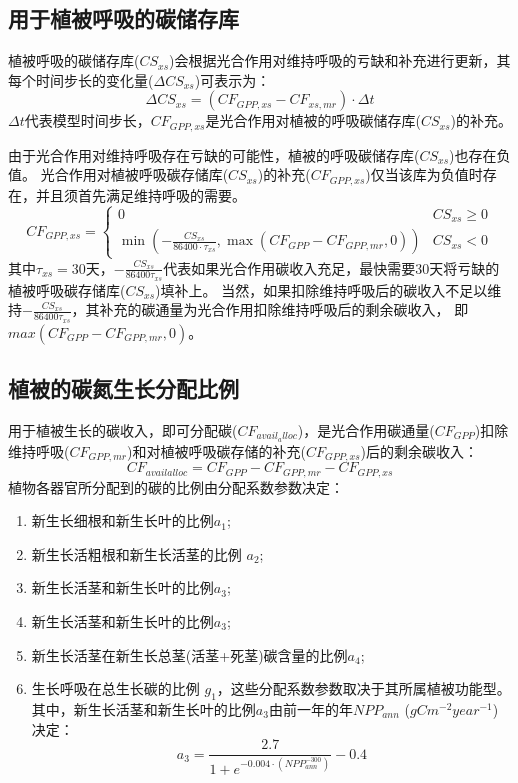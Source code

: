 \subsection{用于植被呼吸的碳储存库}
植被呼吸的碳储存库($CS_{xs}$)会根据光合作用对维持呼吸的亏缺和补充进行更新，其每个时间步长的变化量($\Delta CS_{xs}$)可表示为：
\begin{equation}
\Delta CS_{xs}=\left(CF_{GPP, xs}-CF_{xs, mr}\right) \cdot \Delta t
\end{equation}
$\Delta t$代表模型时间步长，$CF_{GPP,xs}$是光合作用对植被的呼吸碳储存库($CS_{xs}$)的补充。



由于光合作用对维持呼吸存在亏缺的可能性，植被的呼吸碳储存库($CS_{xs}$)也存在负值。
光合作用对植被呼吸碳存储库($CS_{xs}$)的补充($CF_{GPP,xs}$)仅当该库为负值时存在，并且须首先满足维持呼吸的需要。
\begin{equation}
CF_{GPP, xs}=\left\{\begin{array}{ll}0 & CS_{xs} \geq 0 \\ \min \left(-\frac{CS_{xs}}{86400 \cdot \tau_{xs}}, \max \left(CF_{GPP}-CF_{GPP, mr}, 0\right)\right) & CS_{xs}<0\end{array}\right.
\end{equation}
其中$\tau_{xs}=30$天，$-\frac{CS_{xs}}{86400 \tau_{xs}}$代表如果光合作用碳收入充足，最快需要30天将亏缺的植被呼吸碳存储库($CS_{xs}$)填补上。
当然，如果扣除维持呼吸后的碳收入不足以维持$-\frac{CS_{xs}}{86400 \tau_{xs}}$，其补充的碳通量为光合作用扣除维持呼吸后的剩余碳收入，
即$max{\left(CF_{GPP}-CF_{GPP,mr},0\right)}$。
\subsection{植被的碳氮生长分配比例}
用于植被生长的碳收入，即可分配碳($CF_{avail_alloc}$)，是光合作用碳通量($CF_{GPP}$)扣除维持呼吸($CF_{GPP,mr}$)和对植被呼吸碳存储的补充($CF_{GPP,xs}$)后的剩余碳收入：
\begin{equation}
CF_{ {availalloc }}=CF_{GPP}-CF_{GPP, mr}-CF_{GPP, xs}
\end{equation}
植物各器官所分配到的碳的比例由分配系数参数决定：
\begin{enumerate}
  \item 新生长细根和新生长叶的比例$a_1$; 
  \item 新生长活粗根和新生长活茎的比例 $a_2$;
  \item 新生长活茎和新生长叶的比例$a_3$;
  \item 新生长活茎和新生长叶的比例$a_3$;
  \item 新生长活茎在新生长总茎(活茎+死茎)碳含量的比例$a_4$;
  \item 生长呼吸在总生长碳的比例 $g_1$，这些分配系数参数取决于其所属植被功能型。其中，新生长活茎和新生长叶的比例$a_3$由前一年的年$NPP_{ann}$ ($g C m^{-2} year^{-1}$)决定：
    \begin{equation}
      a_{3}=\frac{2.7}{1+e^{-0.004 \cdot\left(NPP_{ann}^{-300}\right)}}-0.4
    \end{equation}
\end{enumerate}

